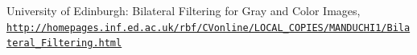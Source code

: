 \documentclass[journal]{IEEEtran}
\begin{document}
%
%


\ifCLASSOPTIONcaptionsoff
  \newpage
\fi





%
%
%
\begin{thebibliography}{1}
University of Edinburgh: Bilateral Filtering for Gray and Color Images,
\\\texttt{\url{http://homepages.inf.ed.ac.uk/rbf/CVonline/LOCAL_COPIES/MANDUCHI1/Bilateral_Filtering.html}}

\end{thebibliography}

% 

\end{document}
